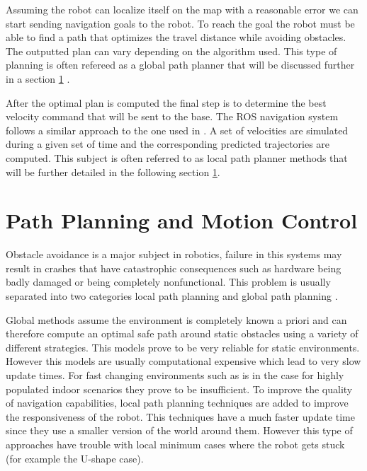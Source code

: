 Assuming the robot can localize itself on the map with a reasonable error we can start sending navigation goals to the robot. To reach the goal the robot must be able to find a path that optimizes the travel distance while avoiding obstacles. The outputted plan can vary depending on the algorithm used. This type of planning is often refereed as a global path planner that will be discussed further in a section \ref{ppmc} .

After the optimal plan is computed the final step is to determine the best velocity command that will be sent to the base.  The ROS navigation system follows a similar approach to the one used in \cite{gerkey2008planning}. A set of velocities are simulated during a given set of time and the corresponding predicted trajectories are  computed. This subject is often referred to as local path planner methods that will be further detailed in the following section \ref{ppmc}.


\section{Path Planning and Motion Control}\label{ppmc}
 Obstacle avoidance is a major subject in robotics, failure in this systems may result in crashes that have catastrophic consequences such as hardware being badly damaged or being completely nonfunctional. This problem is usually separated into two categories local path planning and global path planning \cite{foxdwa}.
 
 
 Global methods assume the environment is completely known a priori and can therefore compute an optimal safe path  around static obstacles using a variety of different strategies. This models prove to be very reliable for static environments. However this models are usually computational expensive which lead to very slow update times. For fast changing environments such as is in the case for highly populated indoor scenarios they prove to be insufficient. 
 To improve the quality of navigation capabilities, local path planning techniques are added to improve the responsiveness of the robot. This techniques have a much faster update time  since they use a smaller version of the world around them. However this type of approaches have trouble with local minimum cases where the robot gets stuck (for example the U-shape case).

